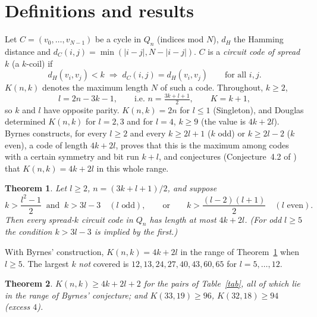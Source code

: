 \documentclass[11pt]{article}
\newtheorem{theorem}{Theorem}
\theoremstyle{remark}
\begin{document}
\section{Definitions and results}
Let $C=(v_0,\dots,v_{N-1})$ be a cycle in $Q_n$ (indices mod $N$), $d_H$ the Hamming distance and
$d_C(i,j)=\min(|i-j|,N-|i-j|)$. $C$ is a \emph{circuit code of spread $k$} (a $k$-coil) if
\[ d_H(v_i,v_j)<k \;\Longrightarrow\; d_C(i,j)=d_H(v_i,v_j)\qquad\text{for all } i,j. \]
$K(n,k)$ denotes the maximum length $N$ of such a code. Throughout, $k\ge 2$,
\[ l=2n-3k-1,\qquad\text{i.e. } n=\tfrac{3k+l+1}{2},\qquad K=k+1, \]
so $k$ and $l$ have opposite parity. $K(n,k)=2n$ for $l\le 1$ (Singleton), and Douglas determined $K(n,k)$ for $l=2,3$ and for $l=4$, $k\ge 9$
(the value is $4k+2l$).
Byrnes \cite{B2} constructs, for every $l\ge 2$ and every $k\ge 2l+1$ ($k$ odd) or $k\ge 2l-2$ ($k$ even), a code of
length $4k+2l$, proves that this is the maximum among codes with a certain symmetry and bit run $k+l$, and conjectures
(Conjecture~4.2 of \cite{B2}) that $K(n,k)=4k+2l$ in this whole range.

\begin{theorem}\label{main}
Let $l\ge 2$, $n=(3k+l+1)/2$, and suppose
\[ k>\frac{l^2-1}{2}\ \text{ and }\ k>3l-3\quad(l\text{ odd}),\qquad\text{or}\qquad k>\frac{(l-2)(l+1)}{2}\quad(l\text{ even}). \]
Then every spread-$k$ circuit code in $Q_n$ has length at most $4k+2l$. (For odd $l\geq 5$ the condition $k>3l-3$ is implied by the first.)
\end{theorem}

With Byrnes' construction, $K(n,k)=4k+2l$ in the range of Theorem~\ref{main} when $l\ge 5$.
The largest $k$ \emph{not} covered is $12,13,24,27,40,43,60,65$ for $l=5,\dots,12$.

\begin{theorem}\label{ce}
$K(n,k)\ge 4k+2l+2$ for the pairs of Table~\ref{tab}, all of which lie in the range of Byrnes' conjecture; and $K(33,19)\ge 96$, $K(32,18)\ge 94$ (excess $4$).
\end{theorem}
\end{document}
